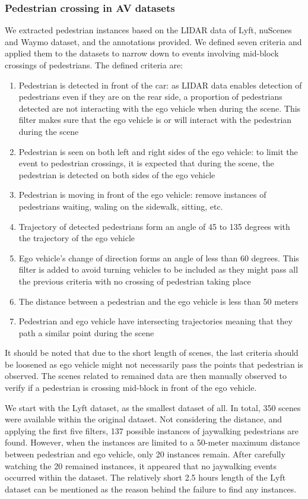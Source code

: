 \subsubsection{Pedestrian crossing in AV datasets}
We extracted pedestrian instances based on the LIDAR data of Lyft, nuScenes and Waymo dataset, and the annotations provided. We defined seven criteria and applied them to the datasets to narrow down to events involving mid-block crossings of pedestrians. The defined criteria are:
\begin{enumerate}
    \item Pedestrian is detected in front of the car: as LIDAR data enables detection of pedestrians even if they are on the rear side, a proportion of pedestrians detected are not interacting with the ego vehicle when during the scene. This filter makes sure that the ego vehicle is or will interact with the pedestrian during the scene
    \item Pedestrian is seen on both left and right sides of the ego vehicle: to limit the event to pedestrian crossings, it is expected that during the scene, the pedestrian is detected on both sides of the ego vehicle
    \item Pedestrian is moving in front of the ego vehicle: remove instances of pedestrians waiting, waling on the sidewalk, sitting, etc.
    \item Trajectory of detected pedestrians form an angle of 45 to 135 degrees with the trajectory of the ego vehicle
    \item Ego vehicle's change of direction forms an angle of less than 60 degrees. This filter is added to avoid turning vehicles to be included as they might pass all the previous criteria with no crossing of pedestrian taking place
    \item The distance between a pedestrian and the ego vehicle is less than 50 meters
    \item Pedestrian and ego vehicle have intersecting trajectories meaning that they path a similar point during the scene
\end{enumerate}
It should be noted that due to the short length of scenes, the last criteria should be loosened as ego vehicle might not necessarily pass the points that pedestrian is observed. The scenes related to remained data are then manually observed to verify if a pedestrian is crossing mid-block in front of the ego vehicle.

We start with the Lyft dataset, as the smallest dataset of all. In total, 350 scenes were available within the original dataset. Not considering the distance, and applying the first five filters, 137 possible instances of jaywalking pedestrians are found. However, when the instances are limited to a 50-meter maximum distance between pedestrian and ego vehicle, only 20 instances remain. After carefully watching the 20 remained instances, it appeared that no jaywalking events occurred within the dataset. The relatively short 2.5 hours length of the Lyft dataset can be mentioned as the reason behind the failure to find any instances. 

